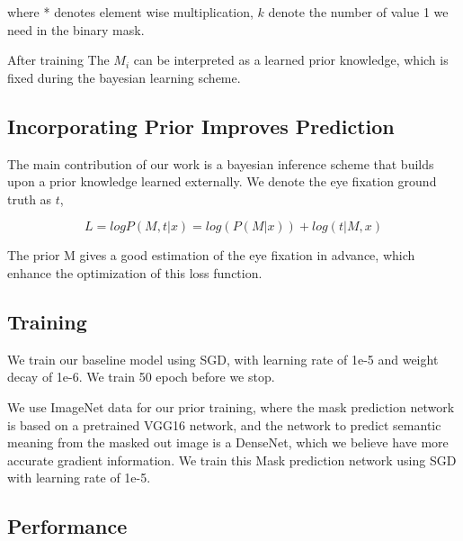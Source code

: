 \documentclass[10pt,twocolumn,letterpaper]{article}
\begin{document}
 where * denotes element wise multiplication, $k$ denote the number of value 1 we need in the binary mask.
 
 After training The $M_i$ can be interpreted as a learned prior knowledge, which is fixed during the bayesian learning scheme.
 
 \subsection{Incorporating Prior Improves Prediction}
 
 The main contribution of our work is a bayesian inference scheme that builds upon a prior knowledge learned externally. We denote the eye fixation ground truth as $t$, 
 
 $$L = logP(M, t|x) = log(P(M|x)) + log(t|M, x)$$
 
 The prior M gives a good estimation of the eye fixation in advance, which enhance the optimization of this loss function.
 
 
 
\subsection{Training}
We train our baseline model using SGD, with learning rate of 1e-5 and weight decay of 1e-6. We train 50 epoch before we stop.

We use ImageNet data for our prior training, where the mask prediction network is based on a pretrained VGG16 network, and the network to predict semantic meaning from the masked out image is a DenseNet, which we believe have more accurate gradient information. We train this Mask prediction network using SGD with learning rate of 1e-5.


\subsection{Performance}
\end{document}
